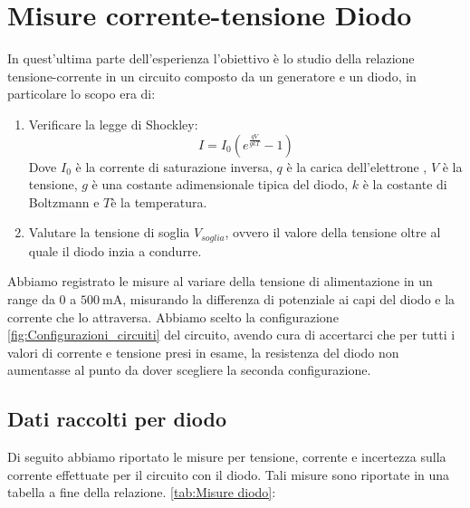\documentclass[letterpaper,12pt]{article}
\begin{document}
\section{Misure corrente-tensione Diodo}
In quest'ultima parte dell'esperienza l'obiettivo è lo studio della relazione tensione-corrente in un circuito composto da un generatore e un diodo, in particolare lo scopo era di:

\begin{enumerate}
    \item Verificare la legge di Shockley:
        \begin{equation}
            I = I_0(e^{\frac{qV}{gkT}}-1)
            \label{legge di Shockley}
        \end{equation}
     Dove $I_0$ è la corrente di saturazione inversa, $q$ è la carica dell'elettrone , $V$ è la tensione, $g$ è una costante adimensionale tipica del diodo, $k$ è la costante di Boltzmann e $T$è la temperatura.
    \item Valutare la tensione di soglia $V_{soglia}$, ovvero il valore della tensione oltre al quale il diodo inzia a condurre.
\end{enumerate}
Abbiamo registrato le misure al variare della tensione di alimentazione in un range da $0$ a $\SI{500}{\milli\ampere}$, misurando la differenza di potenziale ai capi del diodo e la corrente che lo attraversa. Abbiamo scelto la configurazione \ref{fig:Configurazioni_circuiti} del circuito, avendo cura di accertarci che per tutti i valori di corrente e tensione presi in esame, la resistenza del diodo non aumentasse al punto da dover scegliere la seconda configurazione.

\subsection{Dati raccolti per diodo}
Di seguito abbiamo riportato le misure per tensione, corrente e incertezza sulla corrente effettuate per il circuito con il diodo. Tali misure sono riportate in una tabella a fine della relazione.
\ref{tab:Misure diodo}:
\end{document}
